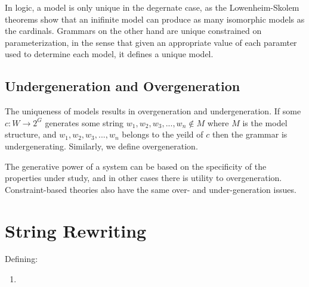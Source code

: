 \documentclass{report}
\begin{document}
In logic, a model is only unique in the degernate case, as the Lowenheim-Skolem
theorems show that an inifinite model can produce as many isomorphic models as
the cardinals. Grammars on the other hand are unique constrained on
parameterization, in the sense that given an appropriate value of each
paramter used to determine each model, it defines a unique model.

\subsection{Undergeneration and Overgeneration}
The uniqueness of models results in overgeneration and undergeneration. If some
$c : W \rightarrow 2^G$ generates some string $w_1, w_2, w_3, ..., w_n \notin
M$ where $M$ is the model structure, and $w_1, w_2, w_3, ..., w_n$ belongs to
the yeild of $c$ then the grammar is undergenerating. Similarly, we define
overgeneration.

The generative power of a system can be based on the specificity of the
properties under study, and in other cases there is utility to overgeneration.
Constraint-based theories also have the same over- and under-generation issues.

\section{String Rewriting}
Defining:
\begin{enumerate}
  \item 
\end{enumerate}
\end{document}

